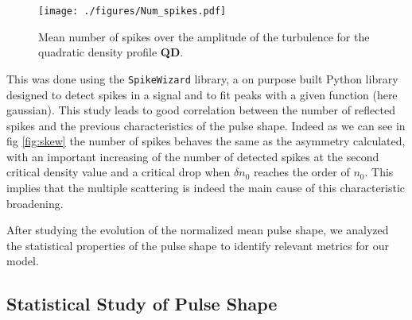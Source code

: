 \documentclass[11pt,openany]{report}
\begin{document}
\begin{multicols}{2}
    \setcounter{totalnumber}{50} %
    \setcounter{topnumber}{50}
    \setcounter{bottomnumber}{50}
    \setlength{\intextsep}{6pt}
    \begin{figure}
        \texttt{[image: ./figures/Num\_spikes.pdf]}
        \caption{Mean number of spikes over the amplitude of the turbulence for the quadratic density profile \textbf{QD}.}
    \end{figure}
    This was done using the \texttt{SpikeWizard} library, a on purpose built Python library designed to detect spikes in a signal and to fit peaks with a given function (here gaussian). This study leads to good correlation between the number of reflected spikes and the previous characteristics of the pulse shape. Indeed as we can see in fig \ref{fig:skew} the number of spikes behaves the same as the asymmetry  calculated, with an important increasing of the number of detected spikes at the second critical density value and a critical drop when $\delta n_0$ reaches the order of $n_0$. This implies that the multiple scattering is indeed the main cause of this characteristic broadening.

    After studying the evolution of the normalized mean pulse shape, we analyzed the statistical properties of the pulse shape to identify relevant metrics for our model.


    \subsection{Statistical Study of Pulse Shape}





\end{multicols}
\end{document}
